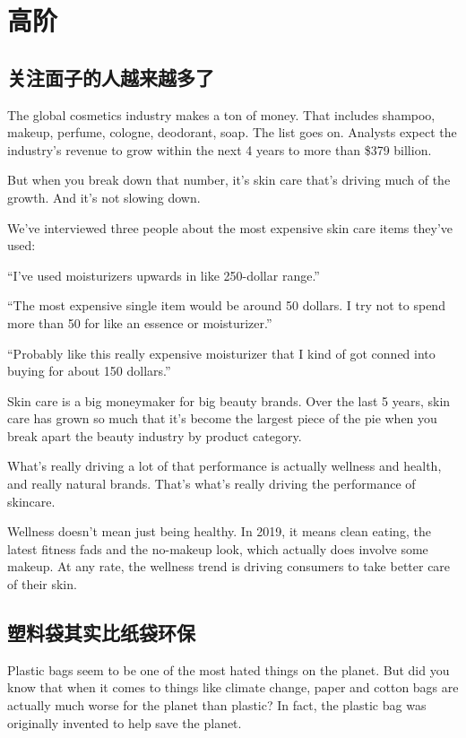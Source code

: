 \newpage
\section{高阶}
\setcounter{subsection}{40}
\subsection{关注面子的人越来越多了}
\begin{margintable}\vspace{-2cm}\footnotesize
\end{margintable}
The global cosmetics industry makes a ton of money. That includes shampoo, makeup, perfume, cologne, deodorant, soap. The list goes on. Analysts expect the industry's revenue to grow within the next 4 years to more than \$379 billion.

But when you break down that number, it's skin care that's driving much of the growth. And it's not slowing down.

We've interviewed three people about the most expensive skin care items they've used:

“I've used moisturizers upwards in like 250-dollar range.”

“The most expensive single item would be around 50 dollars. I try not to spend more than 50 for like an essence or moisturizer.” 

“Probably like this really expensive moisturizer that I kind of got conned into buying for about 150 dollars.”

Skin care is a big moneymaker for big beauty brands. Over the last 5 years, skin care has grown so much that it's become the largest piece of the pie when you break apart the beauty industry by product category.

What's really driving a lot of that performance is actually wellness and health, and really natural brands. That's what's really driving the performance of skincare.

Wellness doesn't mean just being healthy. In 2019, it means clean eating, the latest fitness fads and the no-makeup look, which actually does involve some makeup. At any rate, the wellness trend is driving consumers to take better care of their skin.

\subsection{塑料袋其实比纸袋环保}
\begin{margintable}\vspace{-2cm}\footnotesize
\end{margintable}
Plastic bags seem to be one of the most hated things on the planet. But did you know that when it comes to things like climate change, paper and cotton bags are actually much worse for the planet than plastic? In fact, the plastic bag was originally invented to help save the planet.

